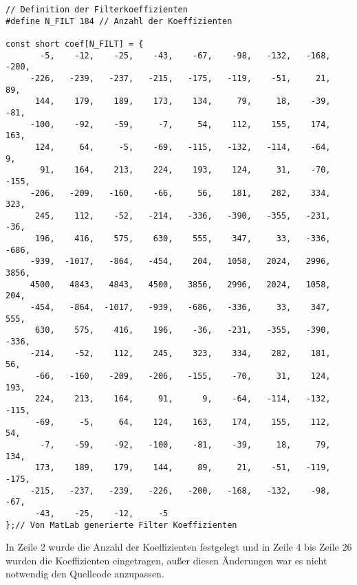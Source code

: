 \begin{adjustbox}{width=\textwidth, keepaspectratio} 
  \label{code:procdataKompFIR}
  \begin{lstlisting}[title=process\textunderscore data\textunderscore KompFIR.c]
// Definition der Filterkoeffizienten
#define N_FILT 184 // Anzahl der Koeffizienten

const short coef[N_FILT] = {
       -5,    -12,    -25,    -43,    -67,    -98,   -132,   -168,   -200,
     -226,   -239,   -237,   -215,   -175,   -119,    -51,     21,     89,
      144,    179,    189,    173,    134,     79,     18,    -39,    -81,
     -100,    -92,    -59,     -7,     54,    112,    155,    174,    163,
      124,     64,     -5,    -69,   -115,   -132,   -114,    -64,      9,
       91,    164,    213,    224,    193,    124,     31,    -70,   -155,
     -206,   -209,   -160,    -66,     56,    181,    282,    334,    323,
      245,    112,    -52,   -214,   -336,   -390,   -355,   -231,    -36,
      196,    416,    575,    630,    555,    347,     33,   -336,   -686,
     -939,  -1017,   -864,   -454,    204,   1058,   2024,   2996,   3856,
     4500,   4843,   4843,   4500,   3856,   2996,   2024,   1058,    204,
     -454,   -864,  -1017,   -939,   -686,   -336,     33,    347,    555,
      630,    575,    416,    196,    -36,   -231,   -355,   -390,   -336,
     -214,    -52,    112,    245,    323,    334,    282,    181,     56,
      -66,   -160,   -209,   -206,   -155,    -70,     31,    124,    193,
      224,    213,    164,     91,      9,    -64,   -114,   -132,   -115,
      -69,     -5,     64,    124,    163,    174,    155,    112,     54,
       -7,    -59,    -92,   -100,    -81,    -39,     18,     79,    134,
      173,    189,    179,    144,     89,     21,    -51,   -119,   -175,
     -215,   -237,   -239,   -226,   -200,   -168,   -132,    -98,    -67,
      -43,    -25,    -12,     -5
};// Von MatLab generierte Filter Koeffizienten
  \end{lstlisting}
\end{adjustbox}

In Zeile 2 wurde die Anzahl der Koeffizienten festgelegt und in Zeile 4 bis Zeile 
26 wurden die Koeffizienten eingetragen, außer diesen \"Anderungen war es nicht 
notwendig den Quellcode anzupassen.\newpage


